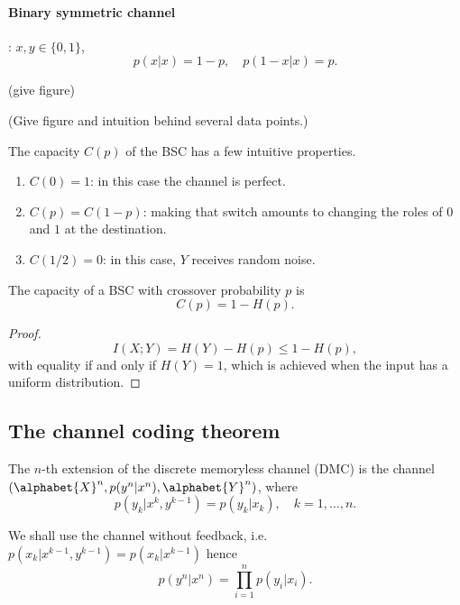 \paragraph{Binary symmetric channel}

: $x, y \in \{0,1\}$, 
$$
	p(x|x) = 1-p, \quad p(1- x|x) = p.
$$

(give figure)


(Give figure and intuition behind several data points.)

The capacity $C(p)$ of the BSC has a few intuitive properties.
\begin{enumerate}
    \item $C(0) = 1$: in this case the channel is perfect.
    
    \item $C(p) = C(1-p)$: making that switch amounts to changing the roles of $0$ and $1$ at the destination.
    
    \item $C(1/2) = 0$: in this case, $Y$ receives random noise.
\end{enumerate}

\begin{theorem}
The capacity of a BSC with crossover probability $p$ is
\[
	C(p) = 1 - H(p).
\]
\end{theorem}


\begin{proof}
$$
	I(X;Y) = H(Y) - H(p) \le 1 - H(p),
$$
with equality if and only if $H(Y) = 1$, which is achieved when the input has a uniform distribution. 
\end{proof}



\subsection{The channel coding theorem}



\begin{definition}
The $n$-th extension of the discrete memoryless channel (DMC) is the channel $(\alphabet{X}^n, p(y^n | x^n), \alphabet{Y}^n)$, where
$$
	p(y_k | x^k, y^{k-1}) = p(y_k | x_k), \quad k=1,\ldots,n.
$$
\end{definition}

We shall use the channel without feedback, i.e. $p(x_k | x^{k-1}, y^{k-1}) = p(x_k | x^{k-1})$ hence
$$
	p(y^n | x^n) = \prod_{i=1}^n p(y_i | x_i).
$$





